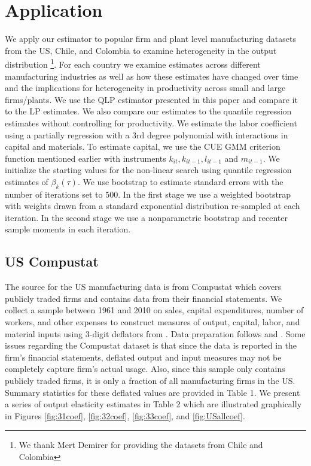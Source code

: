 \documentclass[11pt]{article}
\begin{document}
\newpage
\section{Application} \label{application}
We apply our estimator to popular firm and plant level manufacturing datasets from the US, Chile, and Colombia to examine heterogeneity in the output distribution \footnote{We thank Mert Demirer for providing the datasets from Chile and Colombia}. For each country we examine estimates across different manufacturing industries as well as how these estimates have changed over time and the implications for heterogeneity in productivity across small and large firms/plants. We use the QLP estimator presented in this paper and compare it to the LP estimates. We also compare our estimates to the quantile regression estimates without controlling for productivity. We estimate the labor coefficient using a partially regression with a 3rd degree polynomial with interactions in capital and materials. To estimate capital, we use the CUE GMM criterion function mentioned earlier with instruments $k_{it}, k_{it-1}, l_{it-1}$ and $m_{it-1}$. We initialize the starting values for the non-linear search using quantile regression estimates of $\beta_{k}(\tau)$. We use bootstrap to estimate standard errors with the number of iterations set to $500$. In the first stage we use a weighted bootstrap with weights drawn from a standard exponential distribution re-sampled at each iteration. In the second stage we use a nonparametric bootstrap and recenter sample moments in each iteration.

\subsection{US Compustat}
The source for the US manufacturing data is from Compustat which covers publicly traded firms and contains data from their financial statements. We collect a sample between 1961 and 2010 on sales, capital expenditures, number of workers, and other expenses to construct measures of output, capital, labor, and material inputs using 3-digit deflators from \cite{nber}. Data preparation follows \cite{Keller2009} and \cite{mert}. Some issues regarding the Compustat dataset is that since the data is reported in the firm's financial statements, deflated output and input measures may not be completely capture firm's actual usage. Also, since this sample only contains publicly traded firms, it is only a fraction of all manufacturing firms in the US. Summary statistics for these deflated values are provided in Table 1. We present a series of output elasticity estimates in Table 2 which are illustrated graphically in Figures \ref{fig:31coef}, \ref{fig:32coef}, \ref{fig:33coef}, and \ref{fig:USallcoef}.
 
\end{document}
